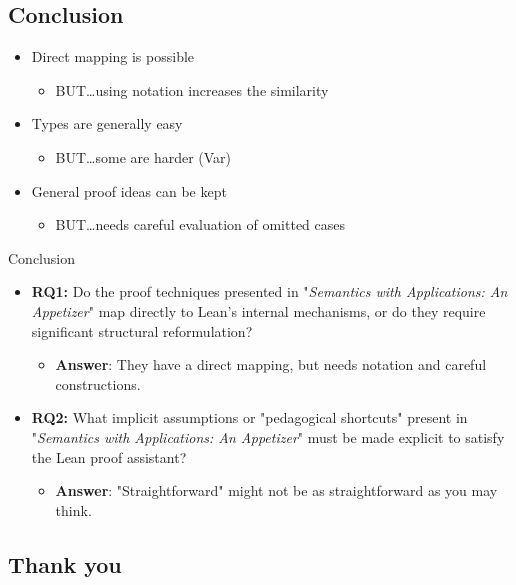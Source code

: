 \documentclass[xcolor={dvipsnames,table}]{beamer}
\begin{document}
\begin{frame}
    \section*{Conclusion}
    \begin{itemize}
        \item<1-> Direct mapping is possible
        \begin{itemize}
        \item<2-> BUT\dots using notation increases the similarity
        \end{itemize}
        \vspace{1em}
        \item<3-> Types are generally easy
        \begin{itemize}
        \item<4-> BUT\dots some are harder (Var)
        \end{itemize}
        \vspace{1em}
        \item<5-> General proof ideas can be kept
        \begin{itemize}
        \item<6-> BUT\dots needs careful evaluation of omitted cases
        \end{itemize}
    \end{itemize}

\end{frame}

\begin{frame}{Conclusion}
  \begin{itemize}
    \item<1-> \textbf{RQ1:} Do the proof techniques presented in "\emph{Semantics with Applications: An Appetizer}"
    map directly to Lean's internal mechanisms, or do they require significant
    structural reformulation?
    \begin{itemize}
        \item<2-> \textbf{Answer}: They have a direct mapping, but needs notation and careful constructions.
    \end{itemize}
    \vspace{1em}
    \item<3-> \textbf{RQ2:} What implicit assumptions or "pedagogical shortcuts"
    present in "\emph{Semantics with Applications: An Appetizer}" must be made explicit to satisfy the Lean proof assistant?
    \begin{itemize}
        \item<4-> \textbf{Answer}: "Straightforward" might not be as straightforward as you may think.
    \end{itemize}
  \end{itemize}
\end{frame}

\begin{frame}
    \section*{Thank you}

\end{frame}
\end{document}
